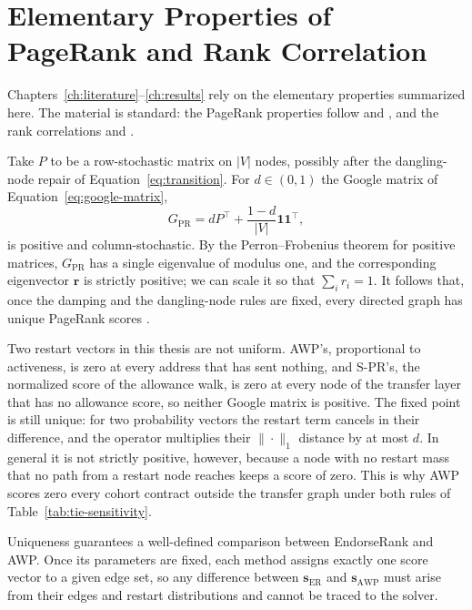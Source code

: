 \section{Elementary Properties of PageRank and Rank Correlation}
\label{ch:appendix-theory}

Chapters~\ref{ch:literature}--\ref{ch:results} rely on the elementary properties summarized here. The material is standard: the PageRank properties follow \textcite{page1999pagerank} and \textcite{langville2006pagerank}, and the rank correlations \textcite{spearman1904proof} and \textcite{kendall1938rank}.


Take $P$ to be a row-stochastic matrix on $|V|$ nodes, possibly after the dangling-node repair of Equation~\eqref{eq:transition}. For $d\in(0,1)$ the Google matrix of Equation~\eqref{eq:google-matrix},
\[
G_{\mathrm{PR}}=d P^{\top}+\frac{1-d}{|V|}\mathbf{1}\mathbf{1}^{\top},
\]
is positive and column-stochastic. By the Perron--Frobenius theorem for positive matrices, $G_{\mathrm{PR}}$ has a single eigenvalue of modulus one, and the corresponding eigenvector $\mathbf{r}$ is strictly positive; we can scale it so that $\sum_i r_i=1$. It follows that, once the damping and the dangling-node rules are fixed, every directed graph has unique PageRank scores \parencite{langville2006pagerank}.

Two restart vectors in this thesis are not uniform. AWP's, proportional to activeness, is zero at every address that has sent nothing, and S-PR's, the normalized score of the allowance walk, is zero at every node of the transfer layer that has no allowance score, so neither Google matrix is positive. The fixed point is still unique: for two probability vectors the restart term cancels in their difference, and the operator multiplies their $\|\cdot\|_1$ distance by at most $d$. In general it is not strictly positive, however, because a node with no restart mass that no path from a restart node reaches keeps a score of zero. This is why AWP scores zero every cohort contract outside the transfer graph under both rules of Table~\ref{tab:tie-sensitivity}.

Uniqueness guarantees a well-defined comparison between EndorseRank and AWP. Once its parameters are fixed, each method assigns exactly one score vector to a given edge set, so any difference between $\mathbf{s}_{\mathrm{ER}}$ and $\mathbf{s}_{\mathrm{AWP}}$ must arise from their edges and restart distributions and cannot be traced to the solver.

